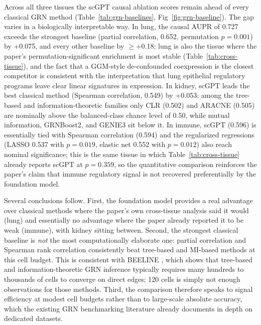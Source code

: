\documentclass[10pt,letterpaper]{article}
\begin{document}
Across all three tissues the scGPT causal ablation scores remain ahead of
every classical GRN method (Table~\ref{tab:grn-baselines},
Fig~\ref{fig:grn-baseline}). The gap varies in a biologically interpretable
way. In lung, the causal AUPR of 0.727 exceeds the strongest baseline
(partial correlation, 0.652, permutation $p{=}0.001$) by +0.075, and every
other baseline by $\geq$+0.18; lung is also the tissue where the paper's
permutation-significant enrichment is most stable
(Table~\ref{tab:cross-tissue}), and the fact that a GGM-style de-confounded
coexpression is the closest competitor is consistent with the interpretation
that lung epithelial regulatory programs leave clear linear signatures in
expression. In kidney, scGPT leads the best classical method (Spearman
correlation, 0.549) by +0.053; among the tree-based and information-theoretic
families only CLR (0.502) and ARACNE (0.505) are nominally above the
balanced-class chance level of 0.50, while mutual information, GRNBoost2,
and GENIE3 sit below it. In immune, scGPT (0.596) is essentially tied with
Spearman correlation (0.594) and the regularized regressions (LASSO 0.537
with $p{=}0.019$, elastic net 0.552 with $p{=}0.012$) also reach nominal
significance; this is the same tissue in which
Table~\ref{tab:cross-tissue} already reports scGPT at $p{=}0.359$, so the
quantitative comparison reinforces the paper's claim that immune
regulatory signal is not recovered preferentially by the foundation model.

Several conclusions follow. First, the foundation model provides a real
advantage over classical methods where the paper's own cross-tissue analysis
said it would (lung) and essentially no advantage where the paper already
reported it to be weak (immune), with kidney sitting between. Second,
the strongest classical baseline is \textit{not} the most computationally
elaborate one: partial correlation and Spearman rank correlation
consistently beat tree-based and MI-based methods at this cell budget.
This is consistent with BEELINE \cite{pratapa_beeline_2020}, which shows
that tree-based and information-theoretic GRN inference typically requires
many hundreds to thousands of cells to converge on direct edges; 120 cells
is simply not enough observations for those methods. Third, the comparison
therefore speaks to signal efficiency at modest cell budgets rather than
to large-scale absolute accuracy, which the existing GRN benchmarking
literature \cite{marbach_dream5_2012,pratapa_beeline_2020,stock_streamline_2024}
already documents in depth on dedicated datasets.
\end{document}
